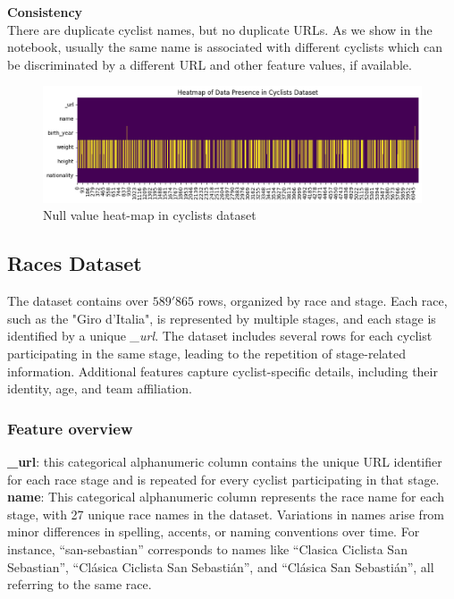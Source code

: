 \noindent
\textbf{Consistency}\\
There are duplicate cyclist names, but no duplicate URLs. As we show in the notebook, usually the same name is associated with different cyclists which can be discriminated by a different URL and other feature values, if available.\\

\begin{figure}[H]
    \centering
    \includegraphics[width=0.7\linewidth]{images//DU/null_values.png}
    \caption{\small Null value heat-map in cyclists dataset}
    \label{fig:null_values}
\end{figure}


\subsection{Races Dataset}

The dataset contains over $589'865$ rows, organized by race and stage. Each race, such as the "Giro d'Italia", is represented by multiple stages, and each stage is identified by a unique \textit{\_url}. The dataset includes several rows for each cyclist participating in the same stage, leading to the repetition of stage-related information. Additional features capture cyclist-specific details, including their identity, age, and team affiliation. 

\subsubsection{Feature overview}


\noindent \textbf{\_url}: this categorical alphanumeric column contains the unique URL identifier for each race stage and is repeated for every cyclist participating in that stage. \\

\noindent \textbf{name}:
This categorical alphanumeric column represents the race name for each stage, with 27 unique race names in the dataset. Variations in names arise from minor differences in spelling, accents, or naming conventions over time. For instance, \enquote{san-sebastian} corresponds to names like \enquote{Clasica Ciclista San Sebastian}, \enquote{Clásica Ciclista San Sebastián}, and \enquote{Clásica San Sebastián}, all referring to the same race.\\ 

